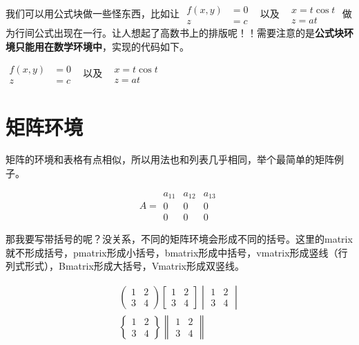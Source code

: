 我们可以用公式块做一些怪东西，比如让
$\begin{aligned}f(x,y) & =0 \\z & =c\end{aligned}$
~以及~
$\begin{gathered}x=t\cos t \\z=at\end{gathered}$
做为行间公式出现在一行。让人想起了高数书上的排版呢！！需要注意的是\textbf{公式块环境只能用在数学环境中}，实现的代码如下。

\begin{latex}
$\begin{aligned}f(x,y) & =0 \\z & =c\end{aligned}$
~以及~
$\begin{gathered}x=t\cos t \\z=at\end{gathered}$
\end{latex}

\section{矩阵环境}
矩阵的环境和表格有点相似，所以用法也和列表几乎相同，举个最简单的矩阵例子。
\begin{codeshow}
\[
A=\begin{matrix}
a_{11} & a_{12} & a_{13}\\
0 & 0 & 0\\
0 & 0 & 0
\end{matrix}
\]
\end{codeshow}

那我要写带括号的呢？没关系，不同的矩阵环境会形成不同的括号。这里的matrix就不形成括号，pmatrix形成小括号，bmatrix形成中括号，vmatrix形成竖线（行列式形式），Bmatrix形成大括号，Vmatrix形成双竖线。
\begin{codeshow}
\begin{gather*}
    \begin{pmatrix}1 & 2\\
    3 & 4\end{pmatrix}
    \begin{bmatrix}1 & 2\\
    3 & 4\end{bmatrix}
    \begin{vmatrix}1 & 2\\
    3 & 4\end{vmatrix}\\
    \begin{Bmatrix}1 & 2\\
    3 & 4\end{Bmatrix}
    \begin{Vmatrix}1 & 2\\
    3 & 4\end{Vmatrix}
\end{gather*}
\end{codeshow}

